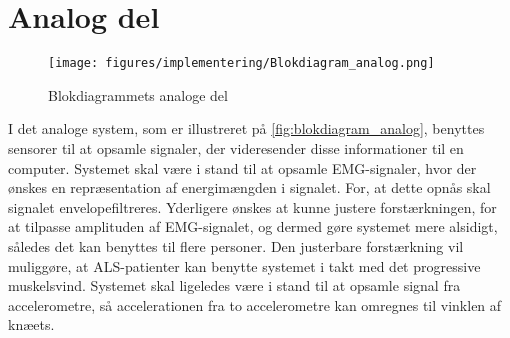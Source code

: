 \section{Analog del} \label{sec:analog_del_krav}
\begin{figure}[H]
\centering
\texttt{[image: figures/implementering/Blokdiagram\_analog.png]}
\caption{Blokdiagrammets analoge del}
\label{fig:blokdiagram_analog}
\end{figure}

\noindent
I det analoge system, som er illustreret på \autoref{fig:blokdiagram_analog}, benyttes sensorer til at opsamle signaler, der videresender disse informationer til en computer. Systemet skal være i stand til at opsamle EMG-signaler, hvor der ønskes en repræsentation af energimængden i signalet. For, at dette opnås skal signalet envelopefiltreres. Yderligere ønskes at kunne justere forstærkningen, for at tilpasse amplituden af EMG-signalet, og dermed gøre systemet mere alsidigt, således det kan benyttes til flere personer. Den justerbare forstærkning vil muliggøre, at ALS-patienter kan benytte systemet i takt med det progressive muskelsvind.
Systemet skal ligeledes være i stand til at opsamle signal fra accelerometre, så accelerationen fra to accelerometre kan omregnes til vinklen af knæets.
